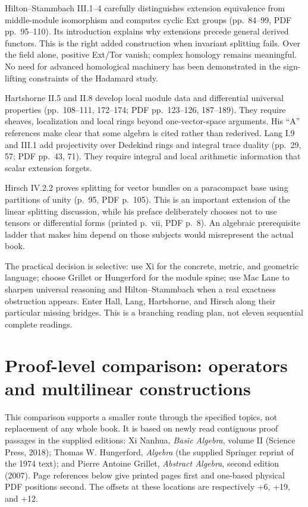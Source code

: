 \documentclass[
  11pt,
]{article}
\begin{document}
Hilton--Stammbach III.1--4 carefully distinguishes extension equivalence
from middle-module isomorphism and computes cyclic Ext groups
(pp.~84--99, PDF pp.~95--110). Its introduction explains why extensions
precede general derived functors. This is the right added construction
when invariant splitting fails. Over the field alone, positive Ext/Tor
vanish; complex homology remains meaningful. No need for advanced
homological machinery has been demonstrated in the sign-lifting
constraints of the Hadamard study.

Hartshorne II.5 and II.8 develop local module data and differential
universal properties (pp.~108--111, 172--174; PDF pp.~123--126,
187--189). They require sheaves, localization and local rings beyond
one-vector-space arguments. His ``A'' references make clear that some
algebra is cited rather than rederived. Lang I.9 and III.1 add
projectivity over Dedekind rings and integral trace duality (pp.~29, 57;
PDF pp.~43, 71). They require integral and local arithmetic information
that scalar extension forgets.

Hirsch IV.2.2 proves splitting for vector bundles on a paracompact base
using partitions of unity (p.~95, PDF p.~105). This is an important
extension of the linear splitting discussion, while his preface
deliberately chooses not to use tensors or differential forms (printed
p.~vii, PDF p.~8). An algebraic prerequisite ladder that makes him
depend on those subjects would misrepresent the actual book.

The practical decision is selective: use Xi for the concrete, metric,
and geometric language; choose Grillet or Hungerford for the module
spine; use Mac Lane to sharpen universal reasoning and Hilton--Stammbach
when a real exactness obstruction appears. Enter Hall, Lang, Hartshorne,
and Hirsch along their particular missing bridges. This is a branching
reading plan, not eleven sequential complete readings.

\section{Proof-level comparison: operators and multilinear
constructions}\label{proof-level-comparison-operators-and-multilinear-constructions}

This comparison supports a smaller route through the specified topics,
not replacement of any whole book. It is based on newly read contiguous
proof passages in the supplied editions: Xi Nanhua, \emph{Basic
Algebra}, volume II (Science Press, 2018); Thomas W. Hungerford,
\emph{Algebra} (the supplied Springer reprint of the 1974 text); and
Pierre Antoine Grillet, \emph{Abstract Algebra}, second edition (2007).
Page references below give printed pages first and one-based physical
PDF positions second. The offsets at these locations are respectively
+6, +19, and +12.
\end{document}
